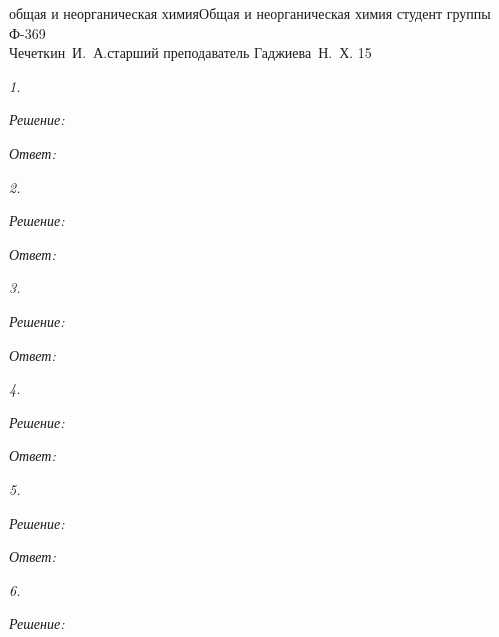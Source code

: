 






{общая и неорганическая химия}{Общая и неорганическая химия}
{студент группы Ф-369\\Чечеткин~И.~А.}{старший преподаватель Гаджиева~Н.~Х.}
{}{15}

\emph{1.}

\vspace*{2em}
\emph{Решение:}

\vspace*{2em}
\emph{Ответ: }


\emph{2.}

\vspace*{2em}
\emph{Решение:}

\vspace*{2em}
\emph{Ответ: }


\emph{3.}

\vspace*{2em}
\emph{Решение:}

\vspace*{2em}
\emph{Ответ: }


\emph{4.}

\vspace*{2em}
\emph{Решение:}

\vspace*{2em}
\emph{Ответ: }


\emph{5.}

\vspace*{2em}
\emph{Решение:}

\vspace*{2em}
\emph{Ответ: }


\emph{6.}

\vspace*{2em}
\emph{Решение:}

